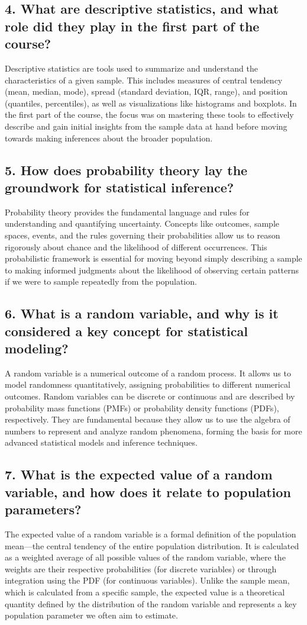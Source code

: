 \documentclass[12pt]{article}
\begin{document}
\subsection*{4. What are descriptive statistics, and what role did they play in the first part of the course?}
Descriptive statistics are tools used to summarize and understand the characteristics of a given sample. This includes measures of central tendency (mean, median, mode), spread (standard deviation, IQR, range), and position (quantiles, percentiles), as well as visualizations like histograms and boxplots. In the first part of the course, the focus was on mastering these tools to effectively describe and gain initial insights from the sample data at hand before moving towards making inferences about the broader population.

\subsection*{5. How does probability theory lay the groundwork for statistical inference?}
Probability theory provides the fundamental language and rules for understanding and quantifying uncertainty. Concepts like outcomes, sample spaces, events, and the rules governing their probabilities allow us to reason rigorously about chance and the likelihood of different occurrences. This probabilistic framework is essential for moving beyond simply describing a sample to making informed judgments about the likelihood of observing certain patterns if we were to sample repeatedly from the population.

\subsection*{6. What is a random variable, and why is it considered a key concept for statistical modeling?}
A random variable is a numerical outcome of a random process. It allows us to model randomness quantitatively, assigning probabilities to different numerical outcomes. Random variables can be discrete or continuous and are described by probability mass functions (PMFs) or probability density functions (PDFs), respectively. They are fundamental because they allow us to use the algebra of numbers to represent and analyze random phenomena, forming the basis for more advanced statistical models and inference techniques.

\subsection*{7. What is the expected value of a random variable, and how does it relate to population parameters?}
The expected value of a random variable is a formal definition of the population mean—the central tendency of the entire population distribution. It is calculated as a weighted average of all possible values of the random variable, where the weights are their respective probabilities (for discrete variables) or through integration using the PDF (for continuous variables). Unlike the sample mean, which is calculated from a specific sample, the expected value is a theoretical quantity defined by the distribution of the random variable and represents a key population parameter we often aim to estimate.
\end{document}
